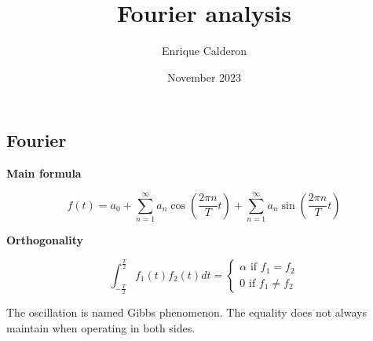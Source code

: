 \documentclass[letterpaper]{article}
\title{Fourier analysis}
\author{Enrique Calderon}
\date{November 2023}
\newcommand{\divline}{\noindent\makebox[\linewidth]{\rule{\textwidth}{0.4pt}}}
\begin{document}
        \maketitle

        \divline

	\begin{multicols}{2}
		\section{Fourier}

                \textbf{Main formula}
  
                \[f(t) = a_{0} + \sum_{n = 1}^{\infty} a_{n} \cos{( \frac{2 \pi n}{T} t )} + \sum_{n = 1}^{\infty} a_{n} \sin{( \frac{2 \pi n}{T} t )} \]

                \textbf{Orthogonality}

                \[ \int_{-\frac{T}{2}}^{\frac{T}{2}} f_{1}(t) f_{2}(t) dt = 
                    \begin{cases} 
					\alpha \text{ if } f_{1} = f_{2} \\
					0 \text{ if } f_{1} \neq f_{2}
				\end{cases}
                \]

                The oscillation is named Gibbs phenomenon.
                The equality does not always maintain when operating in both sides.
                
	\end{multicols}
 
	\divline
\end{document}
